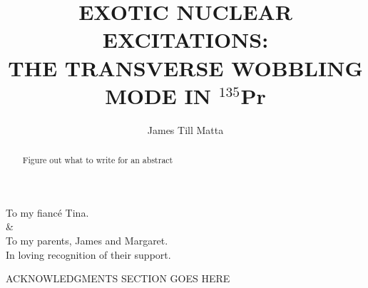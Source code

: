 \documentclass[final,numrefs,sort&compress]{nddiss2e}
\newcommand{\pr}{$^{135}$Pr}
\begin{document}
\frontmatter 
\title{EXOTIC NUCLEAR EXCITATIONS:\\
THE TRANSVERSE WOBBLING MODE IN \pr{}}
\author{James Till Matta}

\maketitle
%
%

\makecopyright

\begin{abstract}
  Figure out what to write for an abstract
\end{abstract}

\renewcommand{\dedicationname}{DEDICATED TO:}

\begin{dedication}
	To my fianc\'e Tina.\\\&\\To my parents, James and Margaret.\\
	In loving recognition of their support.
\end{dedication}

\tableofcontents
\listoffigures
\listoftables

\begin{acknowledge}
  ACKNOWLEDGMENTS SECTION GOES HERE
\end{acknowledge}

\begin{symbols}
\end{symbols}

\mainmatter
%
%
\end{document}
